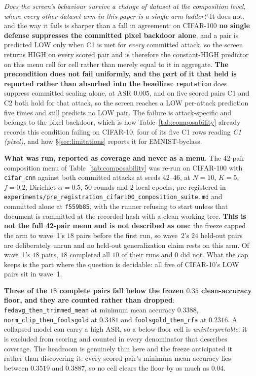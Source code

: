 \documentclass{article}
\begin{document}
\noindent \emph{Does the screen's behaviour survive a change of dataset at the composition level, where every other dataset arm in this paper is a single-arm ladder?} It does not, and the way it fails is sharper than a fall in agreement: on CIFAR-100 \textbf{no single defense suppresses the committed pixel backdoor alone}, and a pair is predicted LOW only when C1 is met for \emph{every} committed attack, so the screen returns HIGH on every scored pair and is therefore the constant-HIGH predictor on this menu cell for cell rather than merely equal to it in aggregate. \textbf{The precondition does not fail uniformly, and the part of it that held is reported rather than absorbed into the headline}: \texttt{reputation} does suppress committed scaling alone, at ASR $0.005$, and on five scored pairs C1 and C2 both hold for that attack, so the screen reaches a LOW per-attack prediction five times and still predicts no LOW pair. The failure is attack-specific and belongs to the pixel backdoor, which is how Table~\ref{tab:composability} already records this condition failing on CIFAR-10, four of its five C1 rows reading \emph{C1 (pixel)}, and how §\ref{sec:limitations} reports it for EMNIST-byclass.

\textbf{What was run, reported as coverage and never as a menu.} The 42-pair composition menu of Table~\ref{tab:composability} was re-run on CIFAR-100 with \texttt{cifar\_cnn} against both committed attacks at seeds $42$--$46$, at $N{=}10$, $K{=}5$, $f{=}0.2$, Dirichlet $\alpha{=}0.5$, $50$ rounds and $2$ local epochs, pre-registered in \texttt{experiments/\allowbreak pre\_registration\_\allowbreak cifar100\_\allowbreak composition\_\allowbreak suite.md} and committed alone at \texttt{f559b85}, with the runner refusing to start unless that document is committed at the recorded hash with a clean working tree. \textbf{This is not the full 42-pair menu and is not described as one}: the freeze capped the arm to wave~1's $18$ pairs before the first run, so wave~2's $24$ held-out pairs are deliberately unrun and no held-out generalization claim rests on this arm. Of wave~1's $18$ pairs, $18$ completed all $10$ of their runs and $0$ did not. What the cap keeps is the part where the question is decidable: all five of CIFAR-10's LOW pairs sit in wave~1.

\textbf{Three of the $18$ complete pairs fall below the frozen $0.35$ clean-accuracy floor, and they are counted rather than dropped}: \texttt{fedavg\_then\_trimmed\_mean} at minimum mean accuracy $0.3388$, \texttt{norm\_clip\_then\_foolsgold} at $0.3481$ and \texttt{foolsgold\_then\_rfa} at $0.2316$. A collapsed model can carry a high ASR, so a below-floor cell is \emph{uninterpretable}: it is excluded from scoring and counted in every denominator that describes coverage. The headroom is genuinely thin here and the freeze anticipated it rather than discovering it: every scored pair's minimum mean accuracy lies between $0.3519$ and $0.3887$, so no cell clears the floor by as much as $0.04$.
\end{document}
